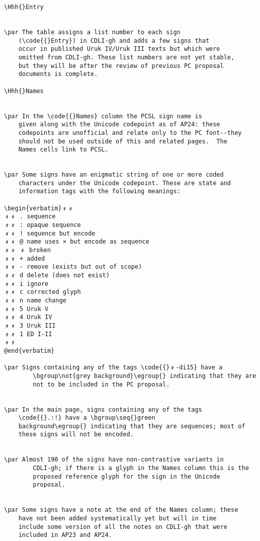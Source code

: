 \begin{verbatim}
\Hhh{}Entry


\par The table assigns a list number to each sign
	(\code{{}Entry}) in CDLI-gh and adds a few signs that
	occur in published Uruk IV/Uruk III texts but which were
	omitted from CDLI-gh. These list numbers are not yet stable,
	but they will be after the review of previous PC proposal
	documents is complete.

\Hhh{}Names


\par In the \code{{}Names} column the PCSL sign name is
	given along with the Unicode codepoint as of AP24: these
	codepoints are unofficial and relate only to the PC font--they
	should not be used outside of this and related pages.  The
	Names cells link to PCSL.


\par Some signs have an enigmatic string of one or more coded
	characters under the Unicode codepoint. These are state and
	information tags with the following meanings:

\begin{verbatim}﹟﹟
﹟﹟ . sequence
﹟﹟ : opaque sequence
﹟﹟ ! sequence but encode
﹟﹟ @ name uses × but encode as sequence
﹟﹟ ﹟ broken
﹟﹟ + added
﹟﹟ - remove (exists but out of scope)
﹟﹟ d delete (does not exist)
﹟﹟ i ignore
﹟﹟ c corrected glyph
﹟﹟ n name change
﹟﹟ 5 Uruk V
﹟﹟ 4 Uruk IV
﹟﹟ 3 Uruk III
﹟﹟ 1 ED I-II
﹟﹟
@end{verbatim}

\par Signs containing any of the tags \code{{}﹟-di15} have a
        \bgroup\not{grey background}\egroup{} indicating that they are
        not to be included in the PC proposal.


\par In the main page, signs containing any of the tags
	\code{{}.:!} have a \bgroup\seq{}green
	background\egroup{} indicating that they are sequences; most of
	these signs will not be encoded.


\par Almost 190 of the signs have non-contrastive variants in
        CDLI-gh; if there is a glyph in the Names column this is the
        proposed reference glyph for the sign in the Unicode
        proposal.


\par Some signs have a note at the end of the Names column; these
	have not been added systematically yet but will in time
	include some version of all the notes on CDLI-gh that were
	included in AP23 and AP24.


\end{verbatim}

